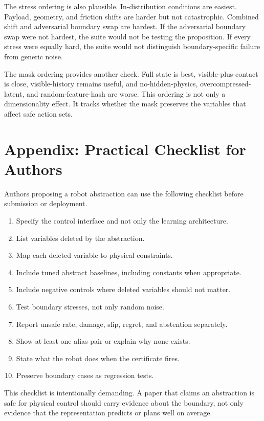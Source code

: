 \documentclass{article}
\begin{document}
The stress ordering is also plausible. In-distribution conditions are easiest.
Payload, geometry, and friction shifts are harder but not catastrophic. Combined
shift and adversarial boundary swap are hardest. If the adversarial boundary
swap were not hardest, the suite would not be testing the proposition. If every
stress were equally hard, the suite would not distinguish boundary-specific
failure from generic noise.

The mask ordering provides another check. Full state is best, visible-plus-contact
is close, visible-history remains useful, and no-hidden-physics,
overcompressed-latent, and random-feature-hash are worse. This ordering is not
only a dimensionality effect. It tracks whether the mask preserves the variables
that affect safe action sets.

\section{Appendix: Practical Checklist for Authors}

Authors proposing a robot abstraction can use the following checklist before
submission or deployment.

\begin{enumerate}
    \item Specify the control interface and not only the learning architecture.
    \item List variables deleted by the abstraction.
    \item Map each deleted variable to physical constraints.
    \item Include tuned abstract baselines, including constants when appropriate.
    \item Include negative controls where deleted variables should not matter.
    \item Test boundary stresses, not only random noise.
    \item Report unsafe rate, damage, slip, regret, and abstention separately.
    \item Show at least one alias pair or explain why none exists.
    \item State what the robot does when the certificate fires.
    \item Preserve boundary cases as regression tests.
\end{enumerate}

This checklist is intentionally demanding. A paper that claims an abstraction is
safe for physical control should carry evidence about the boundary, not only
evidence that the representation predicts or plans well on average.
\end{document}
